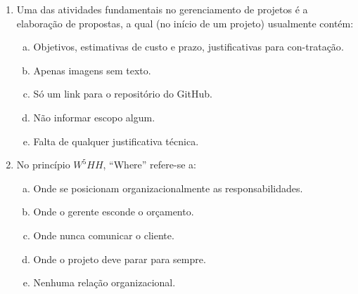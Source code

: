 \documentclass{beamer}
\begin{document}
\begin{frame}
    \begin{enumerate}
        \justifying
        \setcounter{enumi}{18}
        \item<1-2> Uma das atividades fundamentais no gerenciamento de projetos é a elaboração de propostas, a qual (no início de um projeto) usualmente contém:
        \begin{enumerate}[a)]
            \justifying
            \item<1-2> \alert<2>{Objetivos, estimativas de custo e prazo, justificativas para con-tratação}.
            \item<1-2> Apenas imagens sem texto.
            \item<1-2> Só um link para o repositório do GitHub.
            \item<1-2> Não informar escopo algum.
            \item<1-2> Falta de qualquer justificativa técnica.
        \end{enumerate}
        \item<3-4> No princípio $W^{5}HH$, ``Where'' refere-se a:
        \begin{enumerate}[a)]
            \justifying
            \item<3-4> \alert<4>{Onde se posicionam organizacionalmente as responsabilidades}.
            \item<3-4> Onde o gerente esconde o orçamento.
            \item<3-4> Onde nunca comunicar o cliente.
            \item<3-4> Onde o projeto deve parar para sempre.
            \item<3-4> Nenhuma relação organizacional.
        \end{enumerate}
    \end{enumerate}
\end{frame}
\end{document}
